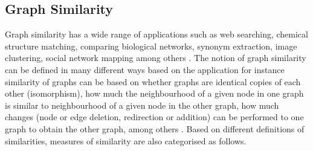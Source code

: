 \documentclass[10pt,a4paper]{article}
\begin{document}
     \subsection{Graph Similarity}
     Graph similarity has a wide range of applications such as web searching, chemical structure matching, comparing biological networks, synonym extraction, image clustering, social network mapping among others \citep{zager2008graph, nikolic2012measuring}. 
     The notion of graph similarity can be defined in many different ways based on the application for instance similarity of graphs can be based on whether graphs are identical copies of each other (isomorphism), how much the neighbourhood of a given node in one graph is similar to neighbourhood of a given node in the other graph, how much changes (node or edge deletion, redirection or addition) can be performed to one graph to obtain the other graph, among others \citep{zager2008graph}. Based on different definitions of similarities, measures of similarity are also categorised as follows.
\end{document}
